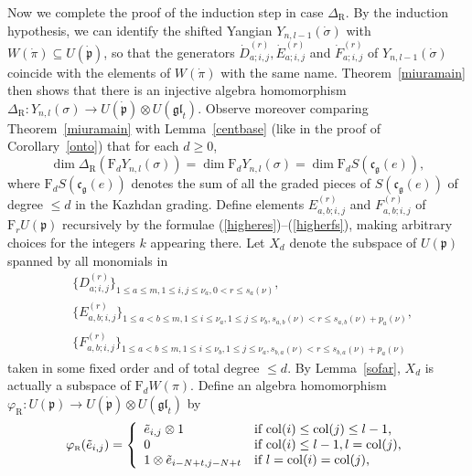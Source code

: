 \documentclass[twoside,12pt,reqno]{amsart}
\def\col{\operatorname{col}}
\def\rt{{\operatorname{\scriptscriptstyle R}}}
\def\F{\mathrm{F}}
\begin{document}
Now we complete the proof of the induction step
in case $\Delta_{\rt}$. 
By the induction hypothesis, we can identify
the shifted Yangian $Y_{n,l-1}(\dot\sigma)$
with $W(\dot\pi)\subseteq U(\dot{\mathfrak{p}})$, so that the generators
$\dot D_{a;i,j}^{(r)}, \dot E_{a;i,j}^{(r)}$
and $\dot F_{a;i,j}^{(r)}$ of 
$Y_{n,l-1}(\dot\sigma)$
coincide with the elements of $W(\dot\pi)$ 
with the same name.
Theorem~\ref{miuramain} then
shows that there is an injective algebra homomorphism
$\Delta_{\rt}:Y_{n,l}(\sigma) \rightarrow 
U(\dot{\mathfrak{p}})
\otimes U(\mathfrak{gl}_t)$.
Observe moreover comparing Theorem~\ref{miuramain}
with Lemma~\ref{centbase} (like in the proof of Corollary~\ref{onto}) that
for each $d \geq 0$,
\begin{equation}\label{dim1}
 \dim \Delta_{\rt} (\F_d Y_{n,l}(\sigma))
=\dim \F_d Y_{n,l}(\sigma)
= \dim \F_d S(\mathfrak{c}_{\mathfrak{g}}(e)),
\end{equation}
where $\F_d S(\mathfrak{c}_{\mathfrak{g}}(e))$
denotes the sum of all the graded pieces of 
$S(\mathfrak{c}_{\mathfrak{g}}(e))$ of degree $\leq d$
in the Kazhdan grading.
Define elements $E_{a,b;i,j}^{(r)}$ and $F_{a,b;i,j}^{(r)}$
of $\F_r U(\mathfrak{p})$
recursively by the formulae (\ref{higheres})--(\ref{higherfs}), making 
arbitrary choices for the integers $k$ appearing there.
Let $X_d$ denote the subspace of $U(\mathfrak{p})$ spanned by
all monomials in
\begin{align*}
&\{D_{a;i,j}^{(r)}\}_{1 \leq a \leq m,
1 \leq i,j \leq \nu_a, 0 < r \leq s_a(\nu)},\\
&\{E_{a,b;i,j}^{(r)}\}_{1 \leq a < b\leq m,
1 \leq i \leq \nu_a, 1 \leq j \leq \nu_b,
s_{a,b}(\nu) < r \leq s_{a,b}(\nu)+p_a(\nu)},\\
&\{F_{a,b;i,j}^{(r)}\}_{1 \leq a < b\leq m,
1 \leq i \leq \nu_b, 1 \leq j \leq \nu_a,
s_{b,a}(\nu) < r \leq s_{b,a}(\nu)+p_a(\nu)}
\end{align*}
taken in some fixed order and of total degree $\leq d$.
By Lemma~\ref{sofar}, $X_d$ is actually 
a subspace of $\F_d W(\pi)$.
Define an algebra homomorphism
$\varphi_{\rt}:U(\mathfrak{p}) \rightarrow U(\dot{\mathfrak{p}}) \otimes
U(\mathfrak{gl}_t)$
by 
\begin{equation}\label{phirt}
\varphi_{\rt}(\tilde e_{i,j}) = \left\{
\begin{array}{ll}
\tilde e_{i,j} \otimes 1&\hbox{if $\col(i) \leq \col(j) 
\leq l-1$,}\\
0&\hbox{if $\col(i) \leq l-1, l=\col(j)$,}\\
1 \otimes \tilde e_{i-N+t,j-N+t}&\hbox{if $l=\col(i)=\col(j)$,}
\end{array}\right.
\end{equation}
\end{document}
